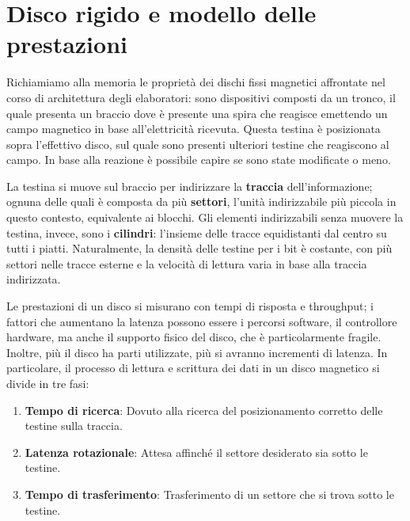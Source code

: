 %

\section{Disco rigido e modello delle prestazioni} %
Richiamiamo alla memoria le proprietà dei dischi fissi magnetici affrontate nel corso di architettura degli elaboratori: sono dispositivi composti da un
tronco, il quale presenta un braccio dove è presente una spira che reagisce emettendo un campo magnetico in base all'elettricità ricevuta. Questa
testina è posizionata sopra l'effettivo disco, sul quale sono presenti ulteriori testine che reagiscono al campo. In base alla reazione è possibile
capire se sono state modificate o meno.\par
La testina si muove sul braccio per indirizzare la \textbf{traccia} dell'informazione; ognuna delle quali è composta da più \textbf{settori}, l'unità
indirizzabile più piccola in questo contesto, equivalente ai blocchi. Gli elementi indirizzabili senza muovere la testina, invece, sono i \textbf{
cilindri}: l'insieme delle tracce equidistanti dal centro su tutti i piatti. Naturalmente, la densità delle testine per i bit è costante, con più
settori nelle tracce esterne e la velocità di lettura varia in base alla traccia indirizzata.\par
Le prestazioni di un disco si misurano con tempi di risposta e throughput; i fattori che aumentano la latenza possono essere i percorsi software, il
controllore hardware, ma anche il supporto fisico del disco, che è particolarmente fragile. Inoltre, più il disco ha parti utilizzate, più si avranno
incrementi di latenza. In particolare, il processo di lettura e scrittura dei dati in un disco magnetico si divide in tre fasi: \begin{enumerate}
    \item \textbf{Tempo di ricerca}: Dovuto alla ricerca del posizionamento corretto delle testine sulla traccia.
    \item \textbf{Latenza rotazionale}: Attesa affinché il settore desiderato sia sotto le testine.
    \item \textbf{Tempo di trasferimento}: Trasferimento di un settore che si trova sotto le testine.
\end{enumerate}

